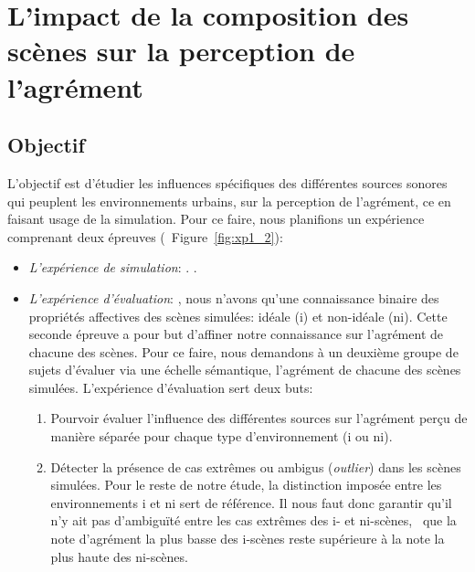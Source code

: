 \section{L'impact de la composition des scènes sur la perception de l'agrément}
\label{sec:xp1_2}

\subsection{Objectif}

L'objectif est d'étudier les influences spécifiques des différentes sources sonores qui peuplent  les  environnements urbains, sur la perception de l'agrément,  ce en faisant usage de la simulation. Pour ce faire, nous planifions un expérience comprenant deux épreuves (\Cf~Figure~\ref{fig:xp1_2}):

\begin{itemize}
\item \emph{L'expérience de simulation}: . .
\item \emph{L'expérience d'évaluation}:  , nous n'avons qu'une connaissance binaire des propriétés affectives des scènes simulées: idéale (i) et non-idéale (ni). Cette seconde épreuve a pour but d'affiner notre connaissance sur l'agrément de chacune des scènes. Pour ce faire, nous demandons à un deuxième groupe de sujets d'évaluer via une échelle sémantique, l'agrément de chacune des scènes simulées. L'expérience d'évaluation sert deux buts:
\begin{enumerate}
\item Pourvoir évaluer l'influence des différentes sources sur l'agrément perçu de manière séparée pour chaque type d'environnement (i ou ni).
\item Détecter la présence de cas extrêmes ou ambigus (\emph{outlier}) dans les scènes simulées. Pour le reste de notre étude, la distinction imposée entre les environnements i et ni sert de référence. Il nous faut donc garantir qu'il n'y ait pas d’ambiguïté entre les cas extrêmes des i- et ni-scènes, \ie~que la note d'agrément la plus basse des i-scènes reste supérieure à la note la plus haute des ni-scènes.
\end{enumerate}

\end{itemize}

